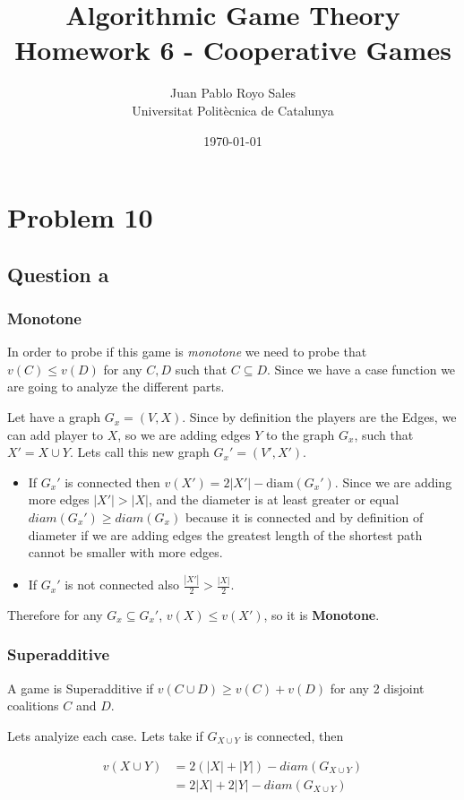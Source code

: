 \documentclass[12pt, a4paper]{article}
\title{%
  Algorithmic Game Theory \\
  Homework 6 - Cooperative Games
}
\author{%
  Juan Pablo Royo Sales\\
  \small{Universitat Politècnica de Catalunya}
}
\date\today
\begin{document}
\maketitle

\section{Problem 10}
\subsection{Question a}
\subsubsection{Monotone}
In order to probe if this game is \textit{monotone} we need to probe that $v(C) \leq v(D)$ for any $C,D$ such that $C \subseteq D$.
Since we have a case function we are going to analyze the different parts. 

Let have a graph $G_x = (V, X)$. Since by definition the players are the Edges, we can add player to $X$, so we are adding edges $Y$ to the graph $G_x$, such that
$X' = X \cup Y$. Lets call this new graph $G_x' = (V', X')$.

\begin{itemize}
  \item If $G_x'$ is connected then $v(X') = 2|X'| - \text{diam}(G_x')$. Since we are adding more edges $|X'| > |X|$, and the diameter is at least greater or equal $diam(G_x') \geq diam(G_x)$ because it is connected and by definition of diameter if we are adding edges the greatest length of the shortest path cannot be smaller with more edges.
  \item If $G_x'$ is not connected also $\frac{|X'|}{2} > \frac{|X|}{2}$.
\end{itemize}

Therefore for any $G_x \subseteq G_x'$, $v(X) \leq v(X')$, so it is \textbf{Monotone}.

\subsubsection{Superadditive}
A game is Superadditive if $v(C \cup D) \geq v(C) + v(D)$ for any 2 disjoint coalitions $C$ and $D$.

Lets analyize each case. 
Lets take if $G_{X \cup Y}$ is connected, then 

\begin{subequations}
  \begin{align}
    v(X \cup Y) &= 2(|X| + |Y|) - diam(G_{X \cup Y})\\
                &= 2|X| + 2|Y| - diam(G_{X \cup Y})
  \end{align}
\end{subequations}
\end{document}

